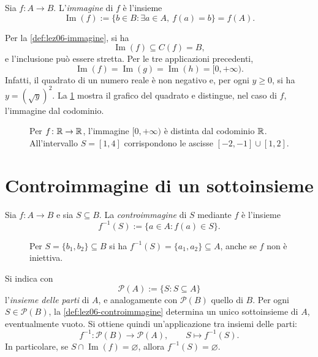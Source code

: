 \begin{definition}
\label{def:lez06-immagine}
Sia \(f\colon A\longrightarrow B\).
L'\emph{immagine} di \(f\) è l'insieme
\[
  \operatorname{Im}(f)
  :=\{b\in B:\exists a\in A,\ f(a)=b\}
  =f(A).
\]
\end{definition}

Per la \cref{def:lez06-immagine}, si ha
\[
  \operatorname{Im}(f)\subseteq C(f)=B,
\]
e l'inclusione può essere stretta. Per le tre
applicazioni precedenti,
\[
  \operatorname{Im}(f)
  =\operatorname{Im}(g)
  =\operatorname{Im}(h)=[0,+\infty).
\]
Infatti, il quadrato di un numero reale è
non negativo e, per ogni \(y\ge0\), si ha
\(y=(\sqrt y)^2\). La \cref{fig:lez06-quadrato}
mostra il grafico del quadrato e distingue,
nel caso di \(f\), l'immagine dal codominio.

\begin{figure}[htbp]
  \centering
  
  \caption{Per \(f\colon\mathbb{R}\to\mathbb{R}\), l'immagine
  \([0,+\infty)\) è distinta dal codominio \(\mathbb{R}\).
  All'intervallo \(S=[1,4]\) corrispondono
  le ascisse \([-2,-1]\cup[1,2]\).}
  \label{fig:lez06-quadrato}
\end{figure}

\clearpage

\section{Controimmagine di un sottoinsieme}
\label{sec:lez06-controimmagine}

\begin{definition}[Controimmagine]
\label{def:lez06-controimmagine}
Sia \(f\colon A\longrightarrow B\) e sia
\(S\subseteq B\). La \emph{controimmagine}
di \(S\) mediante \(f\) è l'insieme
\[
  f^{-1}(S):=\{a\in A:f(a)\in S\}.
\]
\end{definition}

\begin{figure}[htbp]
  \centering
  
  \caption{Per \(S=\{b_1,b_2\}\subseteq B\) si ha
  \(f^{-1}(S)=\{a_1,a_2\}\subseteq A\), anche se
  \(f\) non è iniettiva.}
  \label{fig:lez06-controimmagine-insiemi}
\end{figure}

Si indica con
\[
  \mathcal P(A):=\{S:S\subseteq A\}
\]
l'\emph{insieme delle parti} di \(A\), e
analogamente con \(\mathcal P(B)\) quello di
\(B\). Per ogni \(S\in\mathcal P(B)\), la
\cref{def:lez06-controimmagine} determina
un unico sottoinsieme di \(A\), eventualmente
vuoto. Si ottiene quindi un'applicazione
tra insiemi delle parti:
\[
  f^{-1}\colon\mathcal P(B)\longrightarrow\mathcal P(A),
  \qquad S\longmapsto f^{-1}(S).
\]
In particolare, se \(S\cap\operatorname{Im}(f)=\varnothing\),
allora \(f^{-1}(S)=\varnothing\).

